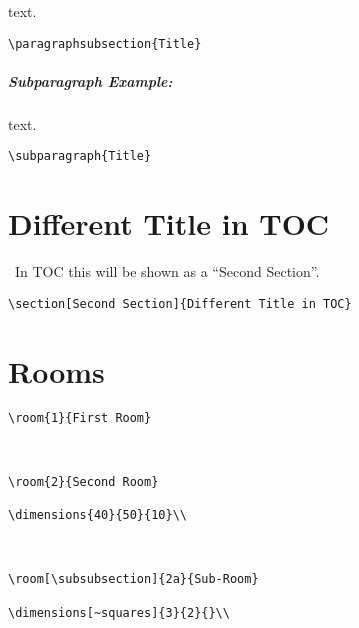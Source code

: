\documentclass[itdr]{subfiles}
\begin{document}
 text. 

\begin{lstlisting}
\paragraphsubsection{Title}
\end{lstlisting}

\subparagraph{Subparagraph Example:} text. 

\noindent
\begin{lstlisting}
\subparagraph{Title}
\end{lstlisting}

\vfill
\break

\section[Second Section]{Different Title in TOC}

\faHandPointUp~In TOC this will be shown as a ``Second Section''.

\begin{lstlisting}
\section[Second Section]{Different Title in TOC}
\end{lstlisting}

\section{Rooms}


\lipsum[66]

\begin{lstlisting}
\room{1}{First Room}
\end{lstlisting}


\\
\lipsum[66]

\begin{lstlisting}
\room{2}{Second Room}

\dimensions{40}{50}{10}\\
\end{lstlisting}


\\
\lipsum[66]

\begin{lstlisting}
\room[\subsubsection]{2a}{Sub-Room}

\dimensions[~squares]{3}{2}{}\\
\end{lstlisting}
\end{document}
